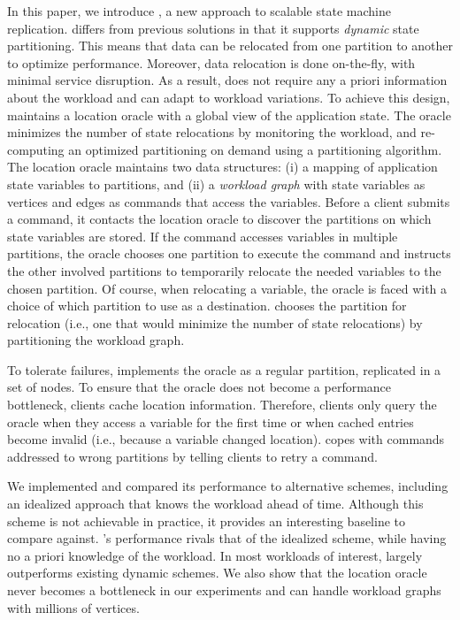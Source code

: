 In this paper, we introduce \dynastar, a new approach to scalable state machine replication.
\dynastar differs from previous solutions in that it supports \emph{dynamic} state partitioning.
This means that data can be relocated from one partition to another to optimize performance.
Moreover, data relocation is done on-the-fly, with minimal service disruption.
As a result, \dynastar does not require any a priori information about the workload and can adapt to workload variations.
To achieve this design, \dynastar maintains a
location oracle with a global view of the application state.  The oracle minimizes the
number of state relocations by monitoring the workload, and
re-computing an optimized partitioning on demand using a 
partitioning algorithm.  
The location oracle maintains two data structures: (i) a mapping of application state variables to partitions, and (ii) a \emph{workload graph} with state variables as vertices and edges as commands that access the variables.  
Before a client submits a command, it contacts the
location oracle to discover the partitions on which state variables are
stored.  If the command accesses variables in multiple partitions, the
oracle chooses one partition to execute the command and instructs the other involved partitions to temporarily relocate 
the needed variables to the chosen partition. Of course, when relocating a variable, the oracle
is faced with a choice of which partition to use as a destination.
\dynastar chooses the partition for relocation (i.e., one that
would minimize the number of state relocations) by partitioning the
workload graph.

To tolerate failures, \dynastar implements the oracle as a regular partition, replicated in a set of nodes.
To ensure that the oracle does not become a performance bottleneck, clients cache location information.
Therefore, clients only query the oracle when they access a variable for the first time or when cached entries become invalid (i.e., because a variable changed location).
\dynastar copes with commands addressed to wrong partitions by telling clients to retry a command.

We implemented \dynastar and compared its performance to
alternative schemes, including an idealized approach that knows the workload ahead of time.
Although this scheme is not achievable in practice, it provides an interesting baseline to compare against.
\dynastar's performance rivals that of the idealized scheme, while having no a priori knowledge of the workload.
In most workloads of interest, \dynastar largely outperforms existing dynamic schemes.
We also show that the location oracle never becomes a bottleneck in our experiments and can handle workload graphs with millions of vertices.

